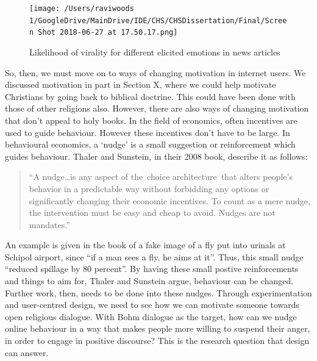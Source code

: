 \documentclass[]{article}
\begin{document}
\begin{figure}
\centering
\texttt{[image: /Users/raviwoods 1/GoogleDrive/MainDrive/IDE/CHS/CHSDissertation/Final/Screen Shot 2018-06-27 at 17.50.17.png]}
\caption{Likelihood of virality for different elicited emotions in news
articles\autocite[pg 8, fig 2]{BergerWhatMakesOnline2012}}
\end{figure}

So, then, we must move on to ways of changing motivation in internet
users. We discussed motivation in part in Section X, where we could help
motivate Christians by going back to biblical doctrine. This could have
been done with those of other religions also. However, there are also
ways of changing motivation that don't appeal to holy books. In the
field of economics, often incentives are used to guide behaviour.
However these incentives don't have to be large. In behavioural
economics, a `nudge' is a small suggestion or reinforcement which guides
behaviour. Thaler and Sunstein, in their 2008
book\autocite{ThalerNudgeimprovingdecisions2008}, describe it as
follows:

\begin{quote}
``A nudge\ldots{}is any aspect of the~choice architecture~that alters
people's behavior in a predictable way without forbidding any options or
significantly changing their economic incentives. To count as a mere
nudge, the intervention must be easy and cheap to avoid. Nudges are not
mandates.''\autocite[pg 6]{ThalerNudgeimprovingdecisions2008}
\end{quote}

An example is given in the book of a fake image of a fly put into
urinals at Schipol airport, since ``if a man sees a fly, he aims at
it''\autocite{ThalerNudgeimprovingdecisions2008}. Thus, this small nudge
``reduced spillage by 80
percent''\autocite{ThalerNudgeimprovingdecisions2008}. By having these
small postive reinforcements and things to aim for, Thaler and Sunstein
argue, behaviour can be changed. Further work, then, needs to be done
into these nudges. Through experimentation and user-centred design, we
need to see how we can motivate someone towards open religious dialogue.
With Bohm dialogue as the target, how can we nudge online behaviour in a
way that makes people more willing to suspend their anger, in order to
engage in positive discourse? This is the research question that design
can answer.
\end{document}
